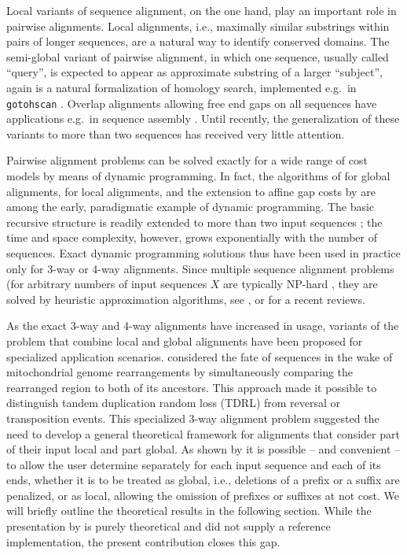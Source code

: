 \documentclass[a4paper,10pt]{article}
\let\cite\citep
\begin{document}
Local variants of sequence alignment, on the one hand, play an important
role in pairwise alignments. Local alignments, i.e., maximally similar
substrings within pairs of longer sequences, are a natural way to identify
conserved domains.  The semi-global variant of pairwise alignment, in which
one sequence, usually called ``query'', is expected to appear as
approximate substring of a larger ``subject'', again is a natural
formalization of homology search, implemented e.g.\ in \texttt{gotohscan}
\cite{Hertel:09a}.  Overlap alignments \cite{Jones:04} allowing free end
gaps on all sequences have applications e.g.\ in sequence assembly
\cite{Rausch:09}. Until recently, the generalization of these variants to
more than two sequences has received very little attention.

Pairwise alignment problems can be solved exactly for a wide range of cost
models by means of dynamic programming. In fact, the algorithms of
\citet{Needleman:70} for global alignments, \citet{Smith:81} for local
alignments, and the extension to affine gap costs by \citet{Gotoh:82} are
among the early, paradigmatic example of dynamic programming. The basic
recursive structure is readily extended to more than two input sequences
\cite{Carillo:88,Lipman:89}; the time and space complexity, however, grows
exponentially with the number of sequences. Exact dynamic programming
solutions thus have been used in practice only for 3-way
\cite{Gotoh:86,Dewey:01,Konagurthu:04,Kruspe:07a} or 4-way
\cite{Steiner:11a} alignments. Since multiple sequence alignment problems
(for arbitrary numbers of input sequences $X$ are typically NP-hard
\cite{Kececioglu:93,Wang:94,Bonizzoni:01,Just:01,Manthey:03,Elias:06}, they
are solved by heuristic approximation algorithms, see
\citet{Chatzou:16}, \citet{Baichoo:17} or \citet{Nute:18} for a recent reviews.

As the exact 3-way and 4-way alignments have increased in usage, variants
of the problem that combine local and global alignments have been proposed
for specialized application scenarios. \citet{AlArab:17a} considered the
fate of sequences in the wake of mitochondrial genome rearrangements by
simultaneously comparing the rearranged region to both of its
ancestors. This approach made it possible to distinguish tandem duplication
random loss (TDRL) from reversal or transposition events. This specialized
3-way alignment problem suggested the need to develop a general theoretical
framework for alignments that consider part of their input local and part
global. As shown by \citet{Retzlaff:18a} it is possible -- and convenient
-- to allow the user determine separately for each input sequence and each
of its ends, whether it is to be treated as global, i.e., deletions of a
prefix or a suffix are penalized, or as local, allowing the omission of
prefixes or suffixes at not cost. We will briefly outline the theoretical
results in the following section. While the presentation by
\citet{Retzlaff:18a} is purely theoretical and did not supply a reference
implementation, the present contribution closes this gap.
\end{document}
